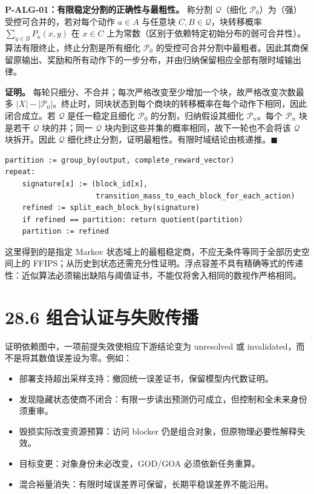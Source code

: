 \documentclass[
  11pt,
  oneside]{book}
\providecommand{\tightlist}{%
  \setlength{\itemsep}{0pt}\setlength{\parskip}{0pt}}
\begin{document}
\hypertarget{p-alg-01}{}\label{p-alg-01}

\textbf{P-ALG-01：有限稳定分割的正确性与最粗性。} 称分割 \(\mathcal Q\)（细化 \(\mathcal P_0\)）为（强）受控可合并的，若对每个动作 \(a\in A\) 与任意块 \(C,B\in\mathcal Q\)，块转移概率 \(\sum_{y\in B}P_a(x,y)\) 在 \(x\in C\) 上为常数（区别于依赖特定初始分布的弱可合并性）。算法有限终止，终止分割是所有细化 \(\mathcal P_0\) 的受控可合并分割中最粗者。因此其商保留原输出、奖励和所有动作下的一步分布，并由归纳保留相应全部有限时域输出律。

\textbf{证明。} 每轮只细分、不合并；每次严格改变至少增加一个块，故严格改变次数最多 \(|X|-|\mathcal P_0|\)。终止时，同块状态到每个商块的转移概率在每个动作下相同，因此闭合成立。若 \(\mathcal Q\) 是任一稳定且细化 \(\mathcal P_0\) 的分割，归纳假设其细化 \(\mathcal P_n\)。每个 \(\mathcal P_n\) 块是若干 \(\mathcal Q\) 块的并；同一 \(\mathcal Q\) 块内到这些并集的概率相同，故下一轮也不会将该 \(\mathcal Q\) 块拆开。因此 \(\mathcal Q\) 细化终止分割，证明最粗性。有限时域结论由核递推。\(\blacksquare\)

\begin{verbatim}
partition := group_by(output, complete_reward_vector)
repeat:
    signature[x] := (block_id[x],
                     transition_mass_to_each_block_for_each_action)
    refined := split_each_block_by(signature)
    if refined == partition: return quotient(partition)
    partition := refined
\end{verbatim}

这里得到的是指定 Markov 状态域上的最粗稳定商，不应无条件等同于全部历史空间上的 FFIPS；从历史到状态还需充分性证明。浮点容差不具有精确等式的传递性：近似算法必须输出缺陷与阈值证书，不能仅将舍入相同的数视作严格相同。

\section{28.6 组合认证与失败传播}\label{ux7ec4ux5408ux8ba4ux8bc1ux4e0eux5931ux8d25ux4f20ux64ad}

证明依赖图中，一项前提失效使相应下游结论变为 unresolved 或 invalidated，而不是将其数值误差设为零。例如：

\begin{itemize}
\tightlist
\item
  部署支持超出采样支持：撤回统一误差证书，保留模型内代数证明。
\item
  发现隐藏状态使商不闭合：有限一步读出预测仍可成立，但控制和全未来身份须重审。
\item
  毁损实际改变资源预算：访问 blocker 仍是组合对象，但原物理必要性解释失效。
\item
  目标变更：对象身份未必改变，GOD/GOA 必须依新任务重算。
\item
  混合裕量消失：有限时域误差界可保留，长期平稳误差界不能沿用。
\end{itemize}
\end{document}
